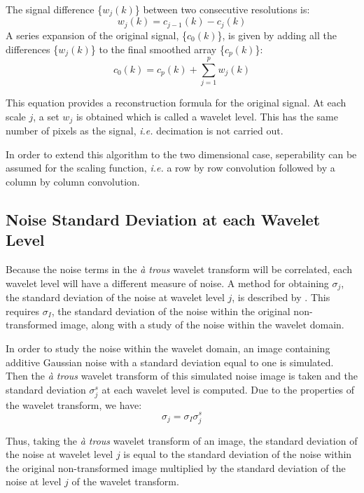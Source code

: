 \documentclass[twocolumn]{article}
\begin{document}
The signal difference \{$w_{j}(k)$\} between two consecutive resolutions is:
\begin{equation}
	w_{j}(k) = c_{j-1}(k) - c_{j}(k)
\end{equation} 
A series expansion of the original signal, \{$c_{0}(k)$\}, is given by adding all the differences \{$w_{j}(k)$\} 
to the final smoothed array \{$c_{p}(k)$\}:
\begin{equation}
	c_{0}(k) = c_{p}(k) + \sum_{j=1}^{p} w_{j}(k)
\end{equation}

This equation provides a reconstruction formula for the original signal.
At each scale $j$, a set $w_{j}$ is obtained which is called a wavelet level. This has the same
number of pixels as the signal, \emph{i.e.} decimation is not carried out.

In order to extend this algorithm to the two dimensional case, seperability can be assumed for 
the scaling function, \emph{i.e.} a row by row convolution followed by a column by column convolution.


\subsection{Noise Standard Deviation at each Wavelet Level}
\label{sec:simNoiseImage}

Because the noise terms in the \emph{\`a trous} wavelet transform will be correlated, 
each wavelet level will have a different measure of noise.
A method for obtaining $\sigma_{j}$, the standard deviation of the noise at wavelet level $j$, is
described by \cite{stark95}. This requires $\sigma_{I}$, the standard deviation of the noise within the 
original non-transformed image, along with a study of the noise within the wavelet domain.

In order to study the noise within the wavelet domain, an image containing additive Gaussian noise 
with a standard deviation 
equal to one is simulated. Then the \emph{\`a trous} wavelet transform of this simulated noise 
image is taken and the standard deviation $\sigma_{j}^{s}$ at each wavelet level is computed.
Due to the properties of the wavelet transform, we have: 
\begin{equation}
	\sigma_{j}=\sigma_{I}\sigma_{j}^{s}
	\label{eq:sigmaJ}
\end{equation}

Thus, taking the \emph{\`a trous} wavelet transform of an image,
the standard deviation of the noise at wavelet level $j$ is equal to the standard deviation of the
noise within the original non-transformed image multiplied by the standard deviation of the noise at level $j$
of the wavelet transform.   
\end{document}
